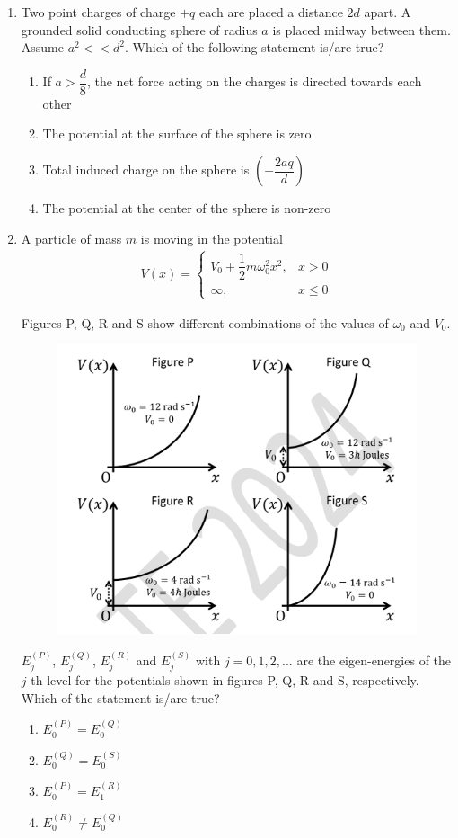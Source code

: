\documentclass[journal,12pt,onecolumn]{IEEEtran}
\theoremstyle{remark}
\begin{document}
\begin{enumerate}
\item Two point charges of charge $+q$ each are placed a distance $2d$ apart. A grounded solid conducting sphere of radius $a$ is placed midway between them. Assume $a^2 << d^2$. Which of the following statement is/are true?
\begin{enumerate}
    \item If $a > \dfrac{d}{8}$, the net force acting on the charges is directed towards each other
    \item The potential at the surface of the sphere is zero
    \item Total induced charge on the sphere is $\left( -\dfrac{2a q}{d} \right)$
    \item The potential at the center of the sphere is non-zero
\end{enumerate}

\item A particle of mass $m$ is moving in the potential
\begin{align*}
    V(x) =
\begin{cases}
V_0 + \dfrac{1}{2} m \omega_0^2 x^2,& x > 0\\
\infty,& x \leq 0
\end{cases}
\end{align*}

Figures P, Q, R and S show different combinations of the values of $\omega_0$ and $V_0$.
\begin{figure}[H]
    \centering
    \includegraphics[width = 0.6\columnwidth]{fig/Q47.png}
    \caption*{}
    \label{fig: Q47}
\end{figure}
$E_j^{({P})}$, $E_j^{({Q})}$, $E_j^{({R})}$ and $E_j^{({S})}$ with $j=0,1,2,...$ are the eigen-energies of the $j$-th level for the potentials shown in figures P, Q, R and S, respectively. Which of the statement is/are true?
\begin{enumerate}
    \item $E_0^{({P})} = E_0^{({Q})}$
    \item $E_0^{({Q})} = E_0^{({S})}$
    \item $E_0^{({P})} = E_1^{({R})}$
    \item $E_0^{({R})} \neq E_0^{({Q})}$
\end{enumerate}


\end{enumerate}
\end{document}
